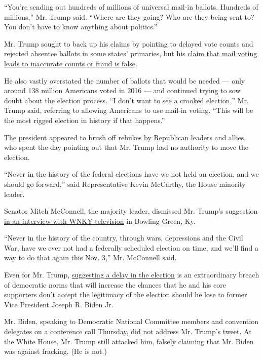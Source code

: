 ``You're sending out hundreds of millions of universal mail-in ballots.
Hundreds of millions,'' Mr. Trump said. ``Where are they going? Who are
they being sent to? You don't have to know anything about politics.''

Mr. Trump sought to back up his claims by pointing to delayed vote
counts and rejected absentee ballots in some states' primaries, but his
\href{https://www.nytimes3xbfgragh.onion/article/mail-in-voting-explained.html}{claim
that mail voting leads to inaccurate counts or fraud is false}.

He also vastly overstated the number of ballots that would be needed ---
only around 138 million Americans voted in 2016 --- and continued trying
to sow doubt about the election process. ``I don't want to see a crooked
election,'' Mr. Trump said, referring to allowing Americans to use
mail-in voting. ``This will be the most rigged election in history if
that happens.''

The president appeared to brush off rebukes by Republican leaders and
allies, who spent the day pointing out that Mr. Trump had no authority
to move the election.

``Never in the history of the federal elections have we not held an
election, and we should go forward,'' said Representative Kevin
McCarthy, the House minority leader.

Senator Mitch McConnell, the majority leader, dismissed Mr. Trump's
suggestion
\href{https://twitter.com/MaxWinitz/status/1288875891985129480?s=20}{in
an interview with WNKY television} in Bowling Green, Ky.

``Never in the history of the country, through wars, depressions and the
Civil War, have we ever not had a federally scheduled election on time,
and we'll find a way to do that again this Nov. 3,'' Mr. McConnell said.

Even for Mr. Trump,
\href{https://twitter.com/realDonaldTrump/status/1288818160389558273?s=20}{suggesting
a delay in the election} is an extraordinary breach of democratic norms
that will increase the chances that he and his core supporters don't
accept the legitimacy of the election should he lose to former Vice
President Joseph R. Biden Jr.

Mr. Biden, speaking to Democratic National Committee members and
convention delegates on a conference call Thursday, did not address Mr.
Trump's tweet. At the White House, Mr. Trump still attacked him, falsely
claiming that Mr. Biden was against fracking. (He is not.)

